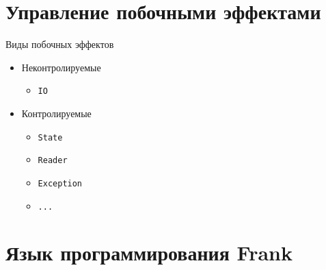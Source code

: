 \section{Управление побочными эффектами}


\begin{frame}{Виды побочных эффектов}
\begin{itemize}
  \item Неконтролируемые
  \begin{itemize}
    \item \texttt{IO}
  \end{itemize}
  \item Контролируемые
  \begin{itemize}
    \item \texttt{State}
    \item \texttt{Reader}
    \item \texttt{Exception}
    \item \texttt{...}
  \end{itemize}
\end{itemize}
\end{frame}


\section{Язык программирования Frank}





